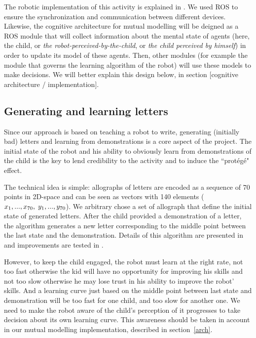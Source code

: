 \documentclass[10pt,a4paper]{article}
\begin{document}
The robotic implementation of this activity is explained in \cite{Hood}. We used ROS to ensure the synchronization and communication between different devices. Likewise, the cognitive architecture for mutual modelling will be deigned as a ROS module that will collect information about the mental state of agents (here, the child, or \textit{the robot-perceived-by-the-child}, or \textit{the child perceived by himself}) in order to update its model of these agents. Then, other modules (for example the module that governs the learning algorithm of the robot) will use these models to make decisions. We will better explain this design below, in section [cognitive architecture / implementation].

\subsection{Generating and learning letters}

Since our approach is based on teaching a robot to write, generating (initially
bad) letters and learning from demonstrations is a core aspect of the project.
The initial state of the robot and his ability to obviously learn from demonstrations of the child is the key to lend credibility to the activity and to induce the ``prot\'eg\'e" effect.

The technical idea is simple: allographs of letters are encoded as a sequence of 70 points in
2D-space and can be seen as vectors with 140 elements
($x_1,...,x_{70},\hspace{1mm}y_1,...,y_{70}$). We arbitrary chose a set of allograph
that define the initial state of generated letters. 
After the child provided a demonstration of a letter, the algorithm
generates a new letter corresponding to the middle point between the last state and the
demonstration. Details of this algorithm are presented in \cite{Hood} and improvements are tested in \cite{jacq2016building}.

However, to keep the child engaged, the robot must learn at the right rate, not too fast otherwise the kid will have
no opportunity for improving his skills and not too slow otherwise he may lose
trust in his ability to improve the robot' skills. And a learning curve just based on the middle point between last state and demonstration will be too fast for one child, and too slow for another one. We need to make the robot aware of the child's perception of it progresses to take decision about its own learning curve. This awareness should be taken in account in our mutual modelling implementation, described in section~\ref{arch}. 
\end{document}
